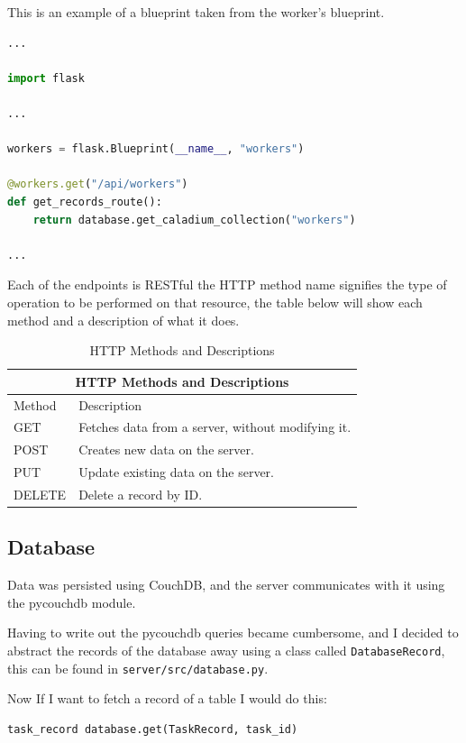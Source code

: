 This is an example of a blueprint taken from the worker's blueprint.
\begin{lstlisting}[language=python]
...

import flask

...

workers = flask.Blueprint(__name__, "workers")

@workers.get("/api/workers")
def get_records_route():
    return database.get_caladium_collection("workers")

...
\end{lstlisting}

Each of the endpoints is RESTful the HTTP method name signifies
the type of operation to be performed on that resource,
the table below will show each method and a description of what it does.

\begin{table}
    \centering
    \begin{tabular}{|p{2cm}|p{6cm}|}
        \hline
        \multicolumn{2}{|c|}{HTTP Methods and Descriptions} \\
        \hline
        Method & Description \\
        \hline
        GET & Fetches data from a server, without modifying it. \\
        \hline
        POST & Creates new data on the server. \\
        \hline
        PUT & Update existing data on the server. \\
        \hline
        DELETE & Delete a record by ID. \\
        \hline
    \end{tabular}
    \caption{HTTP Methods and Descriptions}
    \label{table:httpMethods}
\end{table}

\subsection{Database}
Data was persisted using CouchDB,
and the server communicates with it using the pycouchdb module.

Having to write out the pycouchdb queries became cumbersome,
and I decided to abstract the records of the database away using a class called
\texttt{DatabaseRecord}, this can be found in \texttt{server/src/database.py}.

Now If I want to fetch a record of a table I would do this:
\begin{lstlisting}
task_record database.get(TaskRecord, task_id)
\end{lstlisting}

